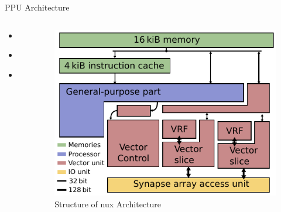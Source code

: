 \documentclass[10pt,aspectratio=169]{beamer}
\begin{document}
\begin{frame}{PPU Architecture}
    \begin{columns}[c]
    \begin{column}{0.5\textwidth}
        \begin{itemize}
            \item \begin{center}\end{center}
            \item \begin{center}\end{center}
            \item \begin{center}\end{center}
        \end{itemize}
    \end{column}

    \begin{column}{0.5\textwidth}
        \centering
        \begin{figure}
            \includegraphics[width=.8\textwidth]{pictures/nux.pdf}
            \caption{\label{fig:nux} Structure of nux Architecture}
        \end{figure}
    \end{column}
    \end{columns}

\end{frame}
\end{document}
